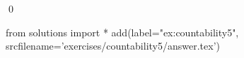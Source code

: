 
\begin{ex} 
  \label{ex:countability5}
  
  \qed
\end{ex} 
\begin{python0}
from solutions import *
add(label="ex:countability5",
    srcfilename='exercises/countability5/answer.tex') 
\end{python0}
